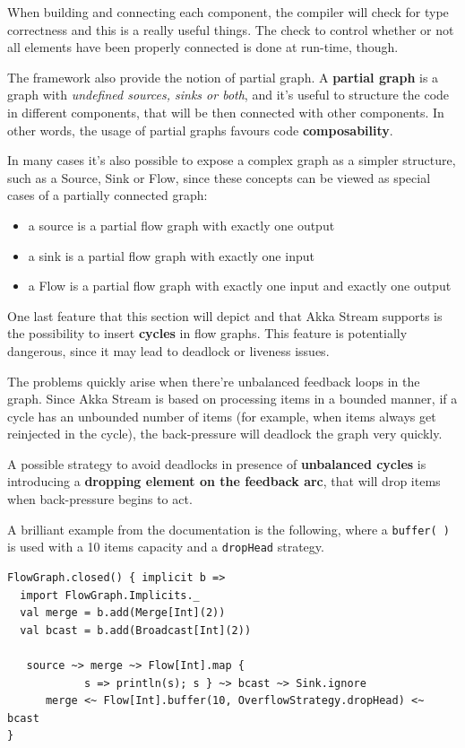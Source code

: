 When building and connecting each component, the compiler will check for
type correctness and this is a really useful things. The check to
control whether or not all elements have been properly connected is done
at run-time, though.

The framework also provide the notion of partial graph. A
\textbf{partial graph} is a graph with \emph{undefined sources, sinks or
both}, and it's useful to structure the code in different components,
that will be then connected with other components. In other words, the
usage of partial graphs favours code \textbf{composability}.

In many cases it's also possible to expose a complex graph as a simpler
structure, such as a Source, Sink or Flow, since these concepts can be
viewed as special cases of a partially connected graph:

\begin{itemize}
\itemsep1pt\parskip0pt
\item
  a source is a partial flow graph with exactly one output
\item
  a sink is a partial flow graph with exactly one input
\item
  a Flow is a partial flow graph with exactly one input and exactly one
  output
\end{itemize}

One last feature that this section will depict and that Akka Stream
supports is the possibility to insert \textbf{cycles} in flow graphs.
This feature is potentially dangerous, since it may lead to deadlock or
liveness issues.

The problems quickly arise when there're unbalanced feedback loops in
the graph. Since Akka Stream is based on processing items in a bounded
manner, if a cycle has an unbounded number of items (for example, when
items always get reinjected in the cycle), the back-pressure will
deadlock the graph very quickly.

A possible strategy to avoid deadlocks in presence of \textbf{unbalanced
cycles} is introducing a \textbf{dropping element on the feedback arc},
that will drop items when back-pressure begins to act.

A brilliant example from the documentation is the following, where a
\texttt{buffer(\ )} is used with a 10 items capacity and a
\texttt{dropHead} strategy.

\begin{verbatim}
FlowGraph.closed() { implicit b =>
  import FlowGraph.Implicits._
  val merge = b.add(Merge[Int](2))
  val bcast = b.add(Broadcast[Int](2))

￼  source ~> merge ~> Flow[Int].map { 
			s => println(s); s } ~> bcast ~> Sink.ignore
      merge <~ Flow[Int].buffer(10, OverflowStrategy.dropHead) <~ bcast
}
\end{verbatim}

